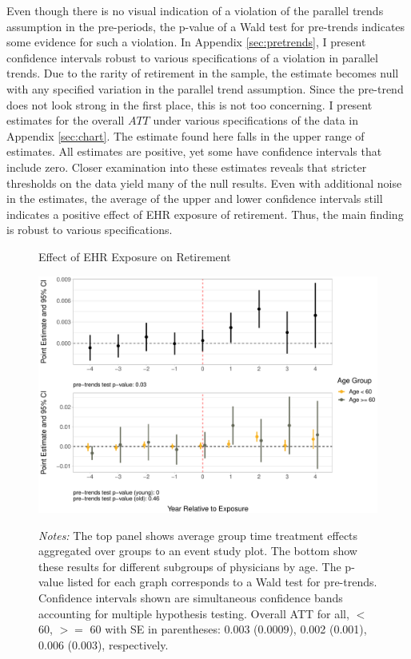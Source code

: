\documentclass[12pt]{article}
\begin{document}
Even though there is no visual indication of a violation of the parallel trends assumption in the pre-periods, the p-value of a Wald test for pre-trends indicates some evidence for such a violation. In Appendix \ref{sec:pretrends}, I present confidence intervals robust to various specifications of a violation in parallel trends. Due to the rarity of retirement in the sample, the estimate becomes null with any specified variation in the parallel trend assumption. Since the pre-trend does not look strong in the first place, this is not too concerning. I present estimates for the overall $ATT$ under various specifications of the data in Appendix \ref{sec:chart}. The estimate found here falls in the upper range of estimates. All estimates are positive, yet some have confidence intervals that include zero. Closer examination into these estimates reveals that stricter thresholds on the data yield many of the null results. Even with additional noise in the estimates, the average of the upper and lower confidence intervals still indicates a positive effect of EHR exposure of retirement. Thus, the main finding is robust to various specifications.   

\begin{figure}[ht!]
    \centering
    \captionsetup{width=.85\linewidth}
    \caption{Effect of EHR Exposure on Retirement}
    \includegraphics[scale=.6]{Objects/retire_plot.pdf}
    \label{fig:retirefirst}
    \vspace{2mm}
    \caption*{\footnotesize{\textit{Notes:} The top panel shows average group time treatment effects aggregated over groups to an event study plot. The bottom show these results for different subgroups of physicians by age. The p-value listed for each graph corresponds to a Wald test for pre-trends. Confidence intervals shown are simultaneous confidence bands accounting for multiple hypothesis testing. Overall ATT for all, $<$ 60, $>=$ 60 with SE in parentheses: 0.003 (0.0009), 0.002 (0.001), 0.006 (0.003), respectively.}}
\end{figure}
\end{document}
